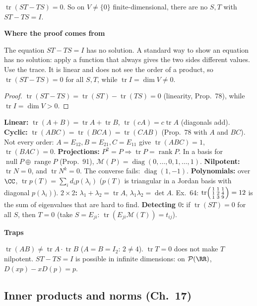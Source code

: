 \documentclass[10pt]{scrartcl}
\DeclareMathOperator{\nul}{null}
\DeclareMathOperator{\range}{range}
\DeclareMathOperator{\tr}{tr}
\newcommand{\PP}{\mathcal P}
\newcommand{\MM}{\mathcal M}
\newenvironment{motive}{\begin{mdframed}[style=thinkbox]\textbf{\color{OliveGreen!75!black}Where the proof comes from}\begin{description}[leftmargin=0.9em,labelindent=0pt,itemsep=2pt,topsep=2pt,font=\normalfont\bfseries\color{OliveGreen!70!black}]}{\end{description}\end{mdframed}}
\newenvironment{trapbox}{\begin{mdframed}[style=trapstyle]\textbf{\color{RawSienna}Traps}\begin{itemize}[itemsep=1pt,topsep=1pt]}{\end{itemize}\end{mdframed}}
\begin{document}
\begin{proposition*}[Prop.~80]
  $\tr(ST-TS)=0$. So on $V\ne\{0\}$ finite-dimensional, there are no $S,T$ with $ST-TS=I$.
\end{proposition*}
\begin{motive}
  \ii[Want.] The equation $ST-TS=I$ has no solution.
  \ii[Know.] A standard way to show an equation has no solution: apply a function that always gives the two sides different values.
   Use the trace. It is linear and does not see the order of a product, so $\tr(ST-TS)=0$ for all $S,T$, while $\tr I=\dim V\ne0$.
\end{motive}
\begin{proof}
  $\tr(ST-TS)=\tr(ST)-\tr(TS)=0$ (linearity, Prop.~78), while $\tr I=\dim V>0$.
\end{proof}

\begin{itemize}
  \ii \textbf{Linear:} $\tr(A+B)=\tr A+\tr B$, $\tr(cA)=c\tr A$ (diagonals add).
  \ii \textbf{Cyclic:} $\tr(ABC)=\tr(BCA)=\tr(CAB)$ (Prop.~78 with $A$ and $BC$). Not every order: $A=E_{12},B=E_{21},C=E_{11}$ give $\tr(ABC)=1$, $\tr(BAC)=0$.
  \ii \textbf{Projections:} $P^2=P\Rightarrow\tr P=\operatorname{rank}P$. In a basis for $\nul P\oplus\range P$ (Prop.~91), $\MM(P)=\operatorname{diag}(0,\dots,0,1,\dots,1)$.
  \ii \textbf{Nilpotent:} $\tr N=0$, and $\tr N^k=0$. The converse fails: $\operatorname{diag}(1,-1)$.
  \ii \textbf{Polynomials:} over $\CC$, $\tr p(T)=\sum_id_ip(\lambda_i)$ ($p(T)$ is triangular in a Jordan basis with diagonal $p(\lambda_i)$).
  \ii \textbf{$2\times2$:} $\lambda_1+\lambda_2=\tr A$, $\lambda_1\lambda_2=\det A$. Ex.~64: $\tr\begin{psmallmatrix}1&1&1\\1&2&4\\1&3&9\end{psmallmatrix}=12$ is the sum of eigenvalues that are hard to find.
  \ii \textbf{Detecting $0$:} if $\tr(ST)=0$ for all $S$, then $T=0$ (take $S=E_{ji}$: $\tr(E_{ji}\MM(T))=t_{ij}$).
\end{itemize}

\begin{trapbox}
  \ii $\tr(AB)\ne\tr A\cdot\tr B$ ($A=B=I_2$: $2\ne4$).
  \ii $\tr T=0$ does not make $T$ nilpotent.
  \ii $ST-TS=I$ is possible in infinite dimensions: on $\PP(\RR)$, $D(xp)-xD(p)=p$.
\end{trapbox}

\subsection{Inner products and norms (Ch.~17)}
\end{document}
